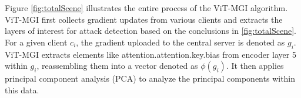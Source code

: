 \documentclass[conference]{IEEEtran}
\begin{document}






Figure \hyperref[fig:totalScene]{\ref{fig:totalScene}} illustrates the entire process of the ViT-MGI algorithm. ViT-MGI first collects gradient updates from various clients and extracts the layers of interest for attack detection based on the conclusions in \hyperref[fig:totalScene]{\ref{fig:totalScene}}. For a given client $c_i$, the gradient uploaded to the central server is denoted as $g_i$. ViT-MGI extracts elements like attention.attention.key.bias from encoder layer 5 within $g_i$, reassembling them into a vector denoted as $\phi(g_i)$. It then applies principal component analysis (PCA) to analyze the principal components within this data.
\end{document}

